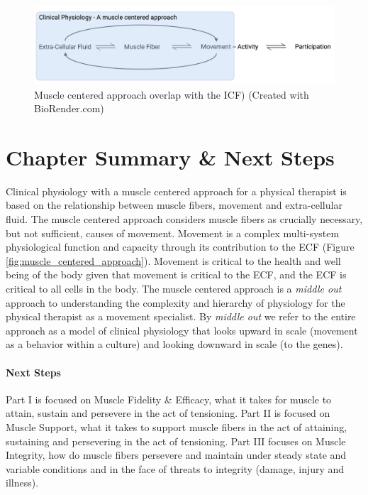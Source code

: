 \begin{figure}[!ht]
    \centering
    \includegraphics[width=1\linewidth]{./figure/muscle_centered_approach_icf.png}
    \caption{Muscle centered approach overlap with the ICF) \footnotesize{(Created with BioRender.com)}}
    \label{fig:muscle_centered_approach_icf}
\end{figure}

\section{Chapter Summary \& Next Steps}

Clinical physiology with a muscle centered approach for a physical therapist is based on the relationship between muscle fibers, movement and extra-cellular fluid. The muscle centered approach considers muscle fibers as crucially necessary, but not sufficient, causes of movement. Movement is a complex multi-system physiological function and capacity through its contribution to the ECF (Figure \ref{fig:muscle_centered_approach}). Movement is critical to the health and well being of the body given that movement is critical to the ECF, and the ECF is critical to all cells in the body. The muscle centered approach is a \textit{middle out} approach to understanding the complexity and hierarchy of physiology for the physical therapist as a movement specialist. By \textit{middle out} we refer to the entire approach as a model of clinical physiology that looks upward in scale (movement as a behavior within a culture) and looking downward in scale (to the genes).

\paragraph{Next Steps}
Part I is focused on Muscle Fidelity \& Efficacy, what it takes for muscle to attain, sustain and persevere in the act of tensioning. Part II is focused on Muscle Support, what it takes to support muscle fibers in the act of attaining, sustaining and persevering in the act of tensioning. Part III focuses on Muscle Integrity, how do muscle fibers persevere and maintain under steady state and variable conditions and in the face of threats to integrity (damage, injury and illness).  

\printbibliography[heading=subbibintoc]